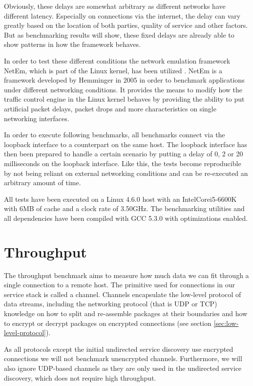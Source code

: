 Obviously, these delays are somewhat arbitrary as different networks have different latency.
Especially on connections via the internet, the delay can vary greatly based on the location of both parties, quality of service and other factors.
But as benchmarking results will show, these fixed delays are already able to show patterns in how the framework behaves.

In order to test these different conditions the network emulation framework NetEm, which is part of the Linux kernel, has been utilized \cite{hemminger2005network}.
NetEm is a framework developed by Hemminger in 2005 in order to benchmark applications under different networking conditions.
It provides the means to modify how the traffic control engine in the Linux kernel behaves by providing the ability to put artificial packet delays, packet drops and more characteristics on single networking interfaces.

In order to execute following benchmarks, all benchmarks connect via the loopback interface to a counterpart on the same host.
The loopback interface has then been prepared to handle a certain scenario by putting a delay of 0, 2 or 20 milliseconds on the loopback interface.
Like this, the tests become reproducible by not being reliant on external networking conditions and can be re-executed an arbitrary amount of time.

\medskip

All tests have been executed on a Linux 4.6.0 host with an Intel\textregistered Core\texttrademark i5-6600K with 6MB of cache and a clock rate of 3.50GHz.
The benchmarking utilities and all dependencies have been compiled with GCC 5.3.0 with optimizations enabled.

\section{Throughput}

The throughput benchmark aims to measure how much data we can fit through a single connection to a remote host.
The primitive used for connections in our service stack is called a channel.
Channels encapsulate the low-level protocol of data streams, including the networking protocol (that is UDP or TCP) knowledge on how to split and re-assemble packages at their boundaries and how to encrypt or decrypt packages on encrypted connections (see section \ref{sec:low-level-protocol}).

As all protocols except the initial undirected service discovery use encrypted connections we will not benchmark unencrypted channels.
Furthermore, we will also ignore UDP-based channels as they are only used in the undirected service discovery, which does not require high throughput.

